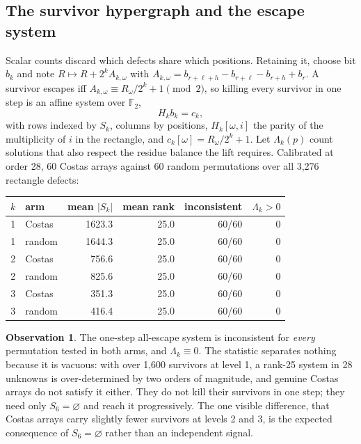 \documentclass[11pt,a4paper]{article}
\theoremstyle{definition}
\newtheorem{observation}[theorem]{Observation}
\newcommand{\F}{\mathbb{F}}
\begin{document}
\subsection{The survivor hypergraph and the escape system}
\label{sec:escape}

Scalar counts discard which defects share which positions. Retaining it, choose
bit $b_k$ and note $R\mapsto R+2^kA_{k,\omega}$ with
$A_{k,\omega}=b_{r+\ell+h}-b_{r+\ell}-b_{r+h}+b_r$. A survivor escapes iff
$A_{k,\omega}\equiv R_\omega/2^k+1 \pmod 2$, so killing every survivor in one
step is an affine system over $\F_2$,
\[
H_k b_k = c_k,
\]
with rows indexed by $S_k$, columns by positions, $H_k[\omega,i]$ the parity of
the multiplicity of $i$ in the rectangle, and $c_k[\omega]=R_\omega/2^k+1$. Let
$\Lambda_k(p)$ count solutions that also respect the residue balance the lift
requires. Calibrated at order 28, 60 Costas arrays against 60 random
permutations over all 3{,}276 rectangle defects:

\begin{center}
\begin{tabular}{@{}rlrrrr@{}}
\toprule
$k$ & arm & mean $|S_k|$ & mean rank & inconsistent & $\Lambda_k>0$ \\
\midrule
1 & Costas & 1623.3 & 25.0 & 60/60 & 0 \\
1 & random & 1644.3 & 25.0 & 60/60 & 0 \\
2 & Costas & 756.6 & 25.0 & 60/60 & 0 \\
2 & random & 825.6 & 25.0 & 60/60 & 0 \\
3 & Costas & 351.3 & 25.0 & 60/60 & 0 \\
3 & random & 416.4 & 25.0 & 60/60 & 0 \\
\bottomrule
\end{tabular}
\end{center}

\begin{observation}
\label{obs:escape}
The one-step all-escape system is inconsistent for \emph{every} permutation
tested in both arms, and $\Lambda_k\equiv0$. The statistic separates nothing
because it is vacuous: with over 1{,}600 survivors at level 1, a rank-25 system
in 28 unknowns is over-determined by two orders of magnitude, and genuine Costas
arrays do not satisfy it either. They do not kill their survivors in one step;
they need only $S_6=\varnothing$ and reach it progressively. The one visible
difference, that Costas arrays carry slightly fewer survivors at levels 2 and 3,
is the expected consequence of $S_6=\varnothing$ rather than an independent
signal.
\end{observation}
\end{document}
